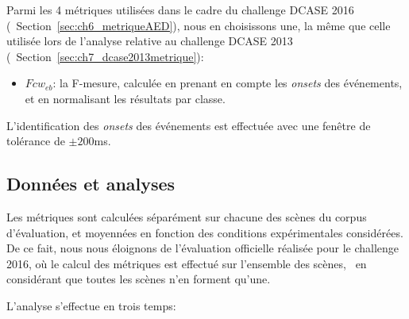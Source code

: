 Parmi les 4 métriques utilisées dans le cadre du challenge DCASE 2016 (\cf~Section~\ref{sec:ch6_metriqueAED}), nous en choisissons une, la même que celle utilisée lors de l'analyse relative au challenge DCASE 2013 (\cf~Section~\ref{sec:ch7_dcase2013metrique}):

\begin{itemize}
\item $Fcw_{eb}$: la F-mesure, calculée en prenant en compte les \emph{onsets} des événements, et en normalisant les résultats par classe.
\end{itemize}

L'identification des \emph{onsets} des événements est effectuée avec une fenêtre de tolérance de $\pm200$ms.

\subsection{Données et analyses}

Les métriques sont calculées séparément sur chacune des scènes du corpus d'évaluation, et moyennées en fonction des conditions expérimentales considérées. De ce fait, nous nous éloignons de l'évaluation officielle réalisée pour le challenge 2016, où le calcul des métriques est effectué sur l'ensemble des scènes, \ie~en considérant que toutes les scènes n'en forment qu'une.

L'analyse s'effectue en trois temps:

